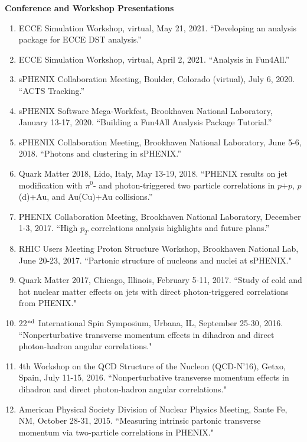 \documentclass[11pt]{article}
\begin{document}
\begin{flushleft}
	\LARGE\textbf{Conference and Workshop Presentations} \\
	\normalsize
	\begin{enumerate}
		\item ECCE Simulation Workshop, virtual, May 21, 2021. ``Developing an analysis package for ECCE DST analysis.''
		\item ECCE Simulation Workshop, virtual, April 2, 2021. ``Analysis in Fun4All.''
		\item sPHENIX Collaboration Meeting, Boulder, Colorado (virtual), July 6, 2020. ``ACTS Tracking.''
		\item sPHENIX Software Mega-Workfest, Brookhaven National Laboratory, January 13-17, 2020. ``Building a Fun4All Analysis Package Tutorial.''
		\item sPHENIX Collaboration Meeting, Brookhaven National Laboratory, June 5-6, 2018. ``Photons and clustering in sPHENIX.''
		\item Quark Matter 2018, Lido, Italy, May 13-19, 2018. ``PHENIX results on jet modification with $\pi^0$- and photon-triggered two particle correlations in $p$$+$$p$, $p$(d)+Au, and Au(Cu)+Au collisions.''
		
		\item PHENIX Collaboration Meeting, Brookhaven National Laboratory, December 1-3, 2017. ``High $p_T$ correlations analysis highlights and future plans.''
		
		\item RHIC Users Meeting Proton Structure Workshop, Brookhaven National Lab, June 20-23, 2017. ``Partonic structure of nucleons and nuclei at sPHENIX."
		
		\item Quark Matter 2017, Chicago, Illinois, February 5-11, 2017. ``Study of cold and hot nuclear matter effects on jets with direct photon-triggered correlations from PHENIX."
		
		
		\item 22$^{\rm nd}$ International Spin Symposium, Urbana, IL, September 25-30, 2016. ``Nonperturbative transverse momentum effects in dihadron and direct photon-hadron angular correlations."
		
		\item 4th Workshop on the QCD Structure of the Nucleon (QCD-N'16), Getxo, Spain, July 11-15, 2016. ``Nonperturbative transverse momentum effects in dihadron and direct photon-hadron angular correlations."
		
		\item American Physical Society Division of Nuclear Physics Meeting, Sante Fe, NM, October 28-31, 2015. ``Measuring intrinsic partonic transverse momentum via two-particle correlations in PHENIX."
		

\end{enumerate}
\end{flushleft}
\end{document}
